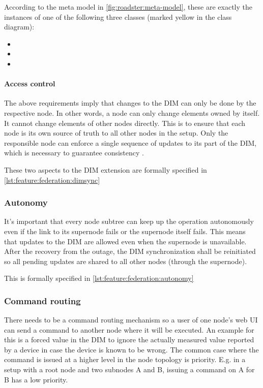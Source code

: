 According to the meta model in \autoref{fig:roadster:meta-model}, these are exactly
the instances of one of the following three classes (marked yellow in the class diagram):
\begin{itemize}
	\item {}
	\item {}
	\item {}
\end{itemize}

\paragraph{Access control}
The above requirements imply that changes to the \gls{DIM} can only be done by the
respective node. In other words, a node can only change elements owned by itself. It
cannot change elements of other nodes directly. This is to ensure that each node is its own source of truth
to all other nodes in the setup. Only the responsible node can enforce a single
sequence of updates to its part of the DIM, which is necessary to guarantee
consistency \cite[Chapter 5, Reliable Pub-Sub (Clone Pattern), Republishing
Updates from Clients]{zmq:zguide}.

These two aspects to the DIM extension are formally specified in \autoref{lst:feature:federation:dimsync}


\subsubsection{Autonomy}
It's important that every node subtree can keep up the operation autonomously even if the
link to its supernode fails or the supernode itself fails. This means that updates to
the \gls{DIM} are allowed even when the supernode is unavailable. After the
recovery from the outage, the \gls{DIM} synchronization shall be reinitiated so
all pending updates are shared to all other nodes (through the supernode).

This is formally specified in \autoref{lst:feature:federation:autonomy}


\subsubsection{Command routing}
There needs to be a command routing mechanism so a user
of one node's web UI can send a command to another node where it will be
executed. An example for this is a forced value in the DIM to ignore the
actually measured value reported by a device in case the device is known to be
wrong. The common case where the command is issued at a higher level in the node
topology is priority. E.g. in a setup with a root node and two
subnodes A and B, issuing a command on A for B has a low priority.

